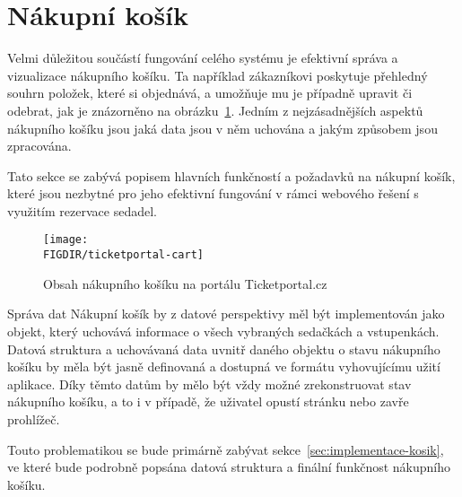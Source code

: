 \section{Nákupní košík}
\label{sec:identifikace-nakupni-kosik}
Velmi důležitou součástí fungování celého systému je efektivní správa a vizualizace nákupního košíku.
Ta například zákazníkovi poskytuje přehledný souhrn položek, které si objednává, a umožňuje mu je případně upravit či odebrat, jak je znázorněno na obrázku~\ref{fig:ticketportal-cart}.
Jedním z nejzásadnějších aspektů nákupního košíku jsou jaká data jsou v něm uchována a jakým způsobem jsou zpracována.

Tato sekce se zabývá popisem hlavních funkčností a požadavků na nákupní košík, které jsou nezbytné pro jeho efektivní fungování v rámci webového řešení s využitím rezervace sedadel.

\begin{figure}[H]
    \centering
    \caption{Obsah nákupního košíku na portálu Ticketportal.cz}
    \texttt{[image: \\FIGDIR/ticketportal-cart]}
    \label{fig:ticketportal-cart}
\end{figure}

\begin{subsection}{Správa dat}
    \label{subsec:identifikace-nakupni-kosik-sprava}
    Nákupní košík by z datové perspektivy měl být implementován jako objekt, který uchovává informace o všech vybraných sedačkách a vstupenkách.
    Datová struktura a uchovávaná data uvnitř daného objektu o stavu nákupního košíku by měla být jasně definovaná a dostupná ve formátu vyhovujícímu užití aplikace.
    Díky těmto datům by mělo být vždy možné zrekonstruovat stav nákupního košíku, a to i v případě, že uživatel opustí stránku nebo zavře prohlížeč.

    Touto problematikou se bude primárně zabývat sekce~\ref{sec:implementace-kosik}, ve které bude podrobně popsána datová struktura a finální funkčnost nákupního košíku.
\end{subsection}

